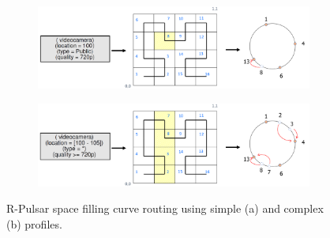 \begin{figure}
\centering
\begin{subfigure}[b]{0.9\textwidth}
   \includegraphics[width=1\linewidth]{Figures/single.pdf}
   \label{fig:Ng1} 
   \caption{}
\end{subfigure}
\begin{subfigure}[b]{0.9\textwidth}
   \includegraphics[width=1\linewidth]{Figures/multi.pdf}
   \label{fig:Ng2}
   \caption{}
\end{subfigure}
\caption{R-Pulsar space filling curve routing using simple (a) and complex (b) profiles.}
\end{figure}
